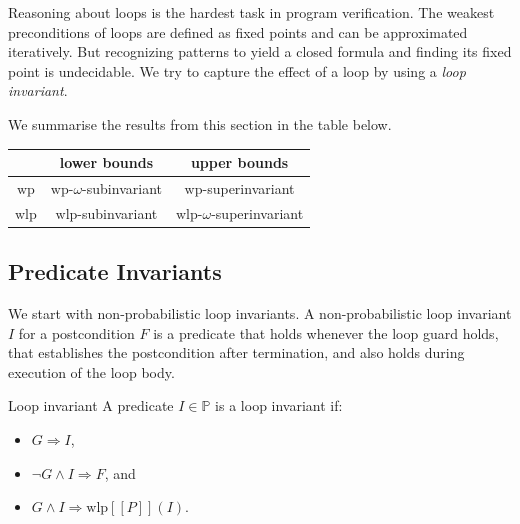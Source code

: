 \documentclass[english]{panikzettel}
\renewcommand{\wp}{\mathrm{wp}}
\newcommand{\wlp}{\mathrm{wlp}}
\begin{document}
Reasoning about loops is the hardest task in program verification.
The weakest preconditions of loops are defined as fixed points and can be approximated iteratively.
But recognizing patterns to yield a closed formula and finding its fixed point is undecidable.
We try to capture the effect of a loop by using a \emph{loop invariant}.

We summarise the results from this section in the table below.
\begin{center}
	\begin{tabular}{c|c|c}
		       & \textbf{lower bounds}       & \textbf{upper bounds}          \\ \hline
		$\wp$  & $\wp$-$\omega$-subinvariant & $\wp$-superinvariant           \\
		$\wlp$ & $\wlp$-subinvariant         & $\wlp$-$\omega$-superinvariant
	\end{tabular}
\end{center}

\subsection{Predicate Invariants}

\begin{halfboxl}
	We start with non-probabilistic loop invariants.
	A non-probabilistic loop invariant $I$ for a postcondition $F$ is a predicate that holds whenever the loop guard holds, that establishes the postcondition after termination, and also holds during execution of the loop body.
\end{halfboxl}%
\begin{halfboxr}
	\vspace{-\baselineskip}
	\begin{defi}{Loop invariant}
		A predicate $I \in \mathbb{P}$ is a loop invariant if:
		\begin{itemize}
			\item $G \Rightarrow I$,
			\item $\neg G \land I \Rightarrow F$, and
			\item $G \land I \Rightarrow \wlp[\![P]\!](I)$.
		\end{itemize}
	\end{defi}
\end{halfboxr}
\end{document}
